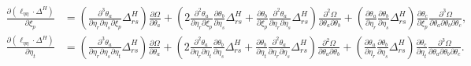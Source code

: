 \documentclass{article}
\begin{document}
\begin{align}
  \tfrac{\partial (\ell_{\eta\eta} \cdot \Delta^H)}{\partial \xi_p}  & = \left( \tfrac{\partial^3 \theta_a}{\partial \eta_r \partial \eta_s \partial \xi_p} \Delta^H_{rs} \right) \tfrac{\partial \Omega}{\partial \theta_a} + \left( 2 \tfrac{\partial^2 \theta_a}{\partial \eta_r \partial \xi_p} \tfrac{\partial \theta_b}{\partial \eta_s} \Delta^H_{rs} + \tfrac{\partial \theta_b}{\partial \xi_p} \tfrac{\partial^2 \theta_a}{\partial \eta_r \partial \eta_s} \Delta^H_{rs} \right) \tfrac{\partial^2 \Omega}{\partial \theta_a \partial \theta_b} + \left( \tfrac{\partial \theta_a}{\partial \eta_r} \tfrac{\partial \theta_b}{\partial \eta_s} \Delta^H_{rs} \right) \tfrac{\partial \theta_c}{\partial \xi_p} \tfrac{\partial^3 \Omega}{\partial \theta_a \partial \theta_b \partial \theta_c},     \\
  \tfrac{\partial (\ell_{\eta\eta} \cdot \Delta^H)}{\partial \eta_t} & = \left( \tfrac{\partial^3 \theta_a}{\partial \eta_r \partial \eta_s \partial \eta_t} \Delta^H_{rs} \right) \tfrac{\partial \Omega}{\partial \theta_a} + \left( 2 \tfrac{\partial^2 \theta_a}{\partial \eta_r \partial \eta_t} \tfrac{\partial \theta_b}{\partial \eta_s} \Delta^H_{rs} + \tfrac{\partial \theta_b}{\partial \eta_t} \tfrac{\partial^2 \theta_a}{\partial \eta_r \partial \eta_s} \Delta^H_{rs} \right) \tfrac{\partial^2 \Omega}{\partial \theta_a \partial \theta_b} + \left( \tfrac{\partial \theta_a}{\partial \eta_r} \tfrac{\partial \theta_b}{\partial \eta_s} \Delta^H_{rs} \right) \tfrac{\partial \theta_c}{\partial \eta_t} \tfrac{\partial^3 \Omega}{\partial \theta_a \partial \theta_b \partial \theta_c}.
\end{align}



\end{document}

